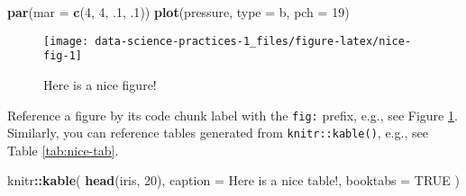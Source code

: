 \documentclass[
]{book}
\newenvironment{Shaded}{\begin{snugshade}}{\end{snugshade}}
\newcommand{\DataTypeTok}[1]{\textcolor[rgb]{0.13,0.29,0.53}{#1}}
\newcommand{\DecValTok}[1]{\textcolor[rgb]{0.00,0.00,0.81}{#1}}
\newcommand{\FloatTok}[1]{\textcolor[rgb]{0.00,0.00,0.81}{#1}}
\newcommand{\KeywordTok}[1]{\textcolor[rgb]{0.13,0.29,0.53}{\textbf{#1}}}
\newcommand{\NormalTok}[1]{#1}
\newcommand{\OperatorTok}[1]{\textcolor[rgb]{0.81,0.36,0.00}{\textbf{#1}}}
\newcommand{\OtherTok}[1]{\textcolor[rgb]{0.56,0.35,0.01}{#1}}
\newcommand{\StringTok}[1]{\textcolor[rgb]{0.31,0.60,0.02}{#1}}
\begin{document}
\begin{Shaded}
\begin{Highlighting}[]
\KeywordTok{par}\NormalTok{(}\DataTypeTok{mar =} \KeywordTok{c}\NormalTok{(}\DecValTok{4}\NormalTok{, }\DecValTok{4}\NormalTok{, }\FloatTok{.1}\NormalTok{, }\FloatTok{.1}\NormalTok{))}
\KeywordTok{plot}\NormalTok{(pressure, }\DataTypeTok{type =} \StringTok{\textquotesingle{}b\textquotesingle{}}\NormalTok{, }\DataTypeTok{pch =} \DecValTok{19}\NormalTok{)}
\end{Highlighting}
\end{Shaded}

\begin{figure}

{\centering \texttt{[image: data-science-practices-1\_files/figure-latex/nice-fig-1]} 

}

\caption{Here is a nice figure!}\label{fig:nice-fig}
\end{figure}

Reference a figure by its code chunk label with the \texttt{fig:} prefix, e.g., see Figure \ref{fig:nice-fig}. Similarly, you can reference tables generated from \texttt{knitr::kable()}, e.g., see Table \ref{tab:nice-tab}.

\begin{Shaded}
\begin{Highlighting}[]
\NormalTok{knitr}\OperatorTok{::}\KeywordTok{kable}\NormalTok{(}
  \KeywordTok{head}\NormalTok{(iris, }\DecValTok{20}\NormalTok{), }\DataTypeTok{caption =} \StringTok{\textquotesingle{}Here is a nice table!\textquotesingle{}}\NormalTok{,}
  \DataTypeTok{booktabs =} \OtherTok{TRUE}
\NormalTok{)}
\end{Highlighting}
\end{Shaded}
\end{document}
